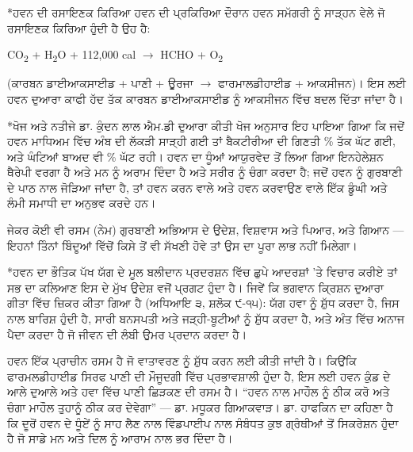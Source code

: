 \documentclass[12pt,a5paper,twoside]{book}  %
\makeatletter
\renewcommand\section{\@startsection{section}{1}{0pt}{1.2em}{0.6em}{\punjabifont\Large\bfseries}}%
\DeclareRobustCommand{\eng}[1]{{\rmfamily #1}}
\makeatother
\begin{document}
{\section*{ਹਵਨ ਦੀ ਰਸਾਇਣਕ ਕਿਰਿਆ}
ਹਵਨ ਦੀ ਪ੍ਰਕਿਰਿਆ ਦੌਰਾਨ ਹਵਨ ਸਮੱਗਰੀ ਨੂੰ ਸਾੜ੍ਹਨ ਵੇਲੇ ਜੋ ਰਸਾਇਣਕ ਕਿਰਿਆ ਹੁੰਦੀ ਹੈ ਉਹ ਹੈ:
\begin{center}
\eng{CO\textsubscript{2} + H\textsubscript{2}O + 112,000 cal $\rightarrow$ HCHO + O\textsubscript{2}}
\end{center}
(ਕਾਰਬਨ ਡਾਈਆਕਸਾਈਡ + ਪਾਣੀ + ਊਰਜਾ $\rightarrow$ ਫਾਰਮਾਲਡੀਹਾਈਡ + ਆਕਸੀਜਨ)। ਇਸ ਲਈ ਹਵਨ ਦੁਆਰਾ ਕਾਫੀ ਹੱਦ ਤੱਕ ਕਾਰਬਨ ਡਾਈਆਕਸਾਈਡ ਨੂੰ ਆਕਸੀਜਨ ਵਿੱਚ ਬਦਲ ਦਿੱਤਾ ਜਾਂਦਾ ਹੈ।

\section*{ਖੋਜ ਅਤੇ ਨਤੀਜੇ}
ਡਾ. ਕੁੰਦਨ ਲਾਲ ਐਮ.ਡੀ ਦੁਆਰਾ ਕੀਤੀ ਖੋਜ ਅਨੁਸਾਰ ਇਹ ਪਾਇਆ ਗਿਆ ਕਿ ਜਦੋਂ ਹਵਨ ਮਾਧਿਅਮ ਵਿੱਚ ਅੰਬ ਦੀ ਲੱਕੜੀ ਸਾੜ੍ਹੀ ਗਈ ਤਾਂ ਬੈਕਟੀਰੀਆ ਦੀ ਗਿਣਤੀ \eng{94\%} ਤੱਕ ਘੱਟ ਗਈ, ਅਤੇ \eng{24} ਘੰਟਿਆਂ ਬਾਅਦ ਵੀ \eng{96\%} ਘੱਟ ਰਹੀ। ਹਵਨ ਦਾ ਧੂੰਆਂ ਆਯੁਰਵੇਦ ਤੋਂ ਲਿਆ ਗਿਆ ਇਨਹੇਲੇਸ਼ਨ ਥੈਰੇਪੀ ਵਰਗਾ ਹੈ ਅਤੇ ਮਨ ਨੂੰ ਅਰਾਮ ਦਿੰਦਾ ਹੈ ਅਤੇ ਸਰੀਰ ਨੂੰ ਚੰਗਾ ਕਰਦਾ ਹੈ; ਜਦੋਂ ਹਵਨ ਨੂੰ ਗੁਰਬਾਣੀ ਦੇ ਪਾਠ ਨਾਲ ਜੋੜਿਆ ਜਾਂਦਾ ਹੈ, ਤਾਂ ਹਵਨ ਕਰਨ ਵਾਲੇ ਅਤੇ ਹਵਨ ਕਰਵਾਉਣ ਵਾਲੇ ਇੱਕ ਡੂੰਘੀ ਅਤੇ ਲੰਮੀ ਸਮਾਧੀ ਦਾ ਅਨੁਭਵ ਕਰਦੇ ਹਨ।

ਜੇਕਰ ਕੋਈ ਵੀ ਰਸਮ (ਨੇਮ) ਗੁਰਬਾਣੀ ਅਭਿਆਸ ਦੇ ਉਦੇਸ਼, ਵਿਸ਼ਵਾਸ ਅਤੇ ਪਿਆਰ, ਅਤੇ ਗਿਆਨ — ਇਹਨਾਂ ਤਿੰਨਾਂ ਬਿੰਦੂਆਂ ਵਿੱਚੋਂ ਕਿਸੇ ਤੋਂ ਵੀ ਸੱਖਣੀ ਹੋਵੇ ਤਾਂ ਉਸ ਦਾ ਪੂਰਾ ਲਾਭ ਨਹੀਂ ਮਿਲੇਗਾ।

\section*{ਹਵਨ ਦਾ ਭੌਤਿਕ ਪੱਖ}
ਯੱਗ ਦੇ ਮੂਲ ਬਲੀਦਾਨ ਪ੍ਰਦਰਸ਼ਨ ਵਿੱਚ ਛੁਪੇ ਆਦਰਸ਼ਾਂ 'ਤੇ ਵਿਚਾਰ ਕਰੀਏ ਤਾਂ ਸਭ ਦਾ ਕਲਿਆਣ ਇਸ ਦੇ ਮੁੱਖ ਉਦੇਸ਼ ਵਜੋਂ ਪ੍ਰਗਟ ਹੁੰਦਾ ਹੈ। ਜਿਵੇਂ ਕਿ ਭਗਵਾਨ ਕ੍ਰਿਸ਼ਨ ਦੁਆਰਾ ਗੀਤਾ ਵਿੱਚ ਜ਼ਿਕਰ ਕੀਤਾ ਗਿਆ ਹੈ (ਅਧਿਆਇ ੩, ਸ਼ਲੋਕ ੯-੧੫): ਯੱਗ ਹਵਾ ਨੂੰ ਸ਼ੁੱਧ ਕਰਦਾ ਹੈ, ਜਿਸ ਨਾਲ ਬਾਰਿਸ਼ ਹੁੰਦੀ ਹੈ, ਸਾਰੀ ਬਨਸਪਤੀ ਅਤੇ ਜੜ੍ਹੀ-ਬੂਟੀਆਂ ਨੂੰ ਸ਼ੁੱਧ ਕਰਦਾ ਹੈ, ਅਤੇ ਅੰਤ ਵਿੱਚ ਅਨਾਜ ਪੈਦਾ ਕਰਦਾ ਹੈ ਜੋ ਜੀਵਨ ਦੀ ਲੰਬੀ ਉਮਰ ਪ੍ਰਦਾਨ ਕਰਦਾ ਹੈ।

ਹਵਨ ਇੱਕ ਪ੍ਰਾਚੀਨ ਰਸਮ ਹੈ ਜੋ ਵਾਤਾਵਰਣ ਨੂੰ ਸ਼ੁੱਧ ਕਰਨ ਲਈ ਕੀਤੀ ਜਾਂਦੀ ਹੈ। ਕਿਉਂਕਿ ਫਾਰਮਲਡੀਹਾਈਡ ਸਿਰਫ ਪਾਣੀ ਦੀ ਮੌਜੂਦਗੀ ਵਿੱਚ ਪ੍ਰਭਾਵਸ਼ਾਲੀ ਹੁੰਦਾ ਹੈ, ਇਸ ਲਈ ਹਵਨ ਕੁੰਡ ਦੇ ਆਲੇ ਦੁਆਲੇ ਅਤੇ ਹਵਾ ਵਿੱਚ ਪਾਣੀ ਛਿੜਕਣ ਦੀ ਰਸਮ ਹੈ। “ਹਵਨ ਨਾਲ ਮਾਹੌਲ ਨੂੰ ਠੀਕ ਕਰੋ ਅਤੇ ਚੰਗਾ ਮਾਹੌਲ ਤੁਹਾਨੂੰ ਠੀਕ ਕਰ ਦੇਵੇਗਾ” — ਡਾ. ਮਧੂਕਰ ਗਿਆਕਵਾੜ। ਡਾ. ਹਾਫਕਿਨ ਦਾ ਕਹਿਣਾ ਹੈ ਕਿ ਦੂਰੋਂ ਹਵਨ ਦੇ ਧੂੰਏਂ ਨੂੰ ਸਾਹ ਲੈਣ ਨਾਲ ਵਿੰਡਪਾਈਪ ਨਾਲ ਸੰਬੰਧਤ ਕੁਝ ਗ੍ਰੰਥੀਆਂ ਤੋਂ ਸਿਕਰੇਸ਼ਨ ਹੁੰਦਾ ਹੈ ਜੋ ਸਾਡੇ ਮਨ ਅਤੇ ਦਿਲ ਨੂੰ ਆਰਾਮ ਨਾਲ ਭਰ ਦਿੰਦਾ ਹੈ।

}
\end{document}
